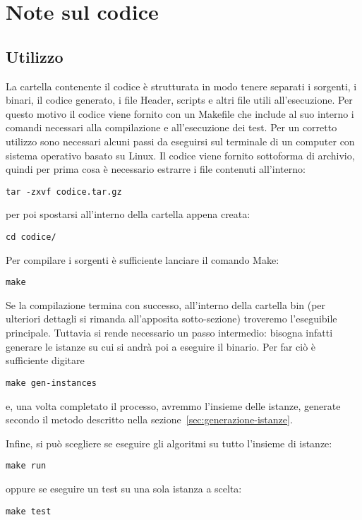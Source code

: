 
\section{Note sul codice}\label{sec:codice}
\subsection{Utilizzo}\label{subsec:utilizzo}
La cartella contenente il codice è strutturata in modo tenere separati i sorgenti, i binari, il codice generato,
i file Header, scripts e altri file utili all'esecuzione.
Per questo motivo il codice viene fornito con un \textsf{Makefile} che include al suo interno i comandi
necessari alla compilazione e all'esecuzione dei test.
Per un corretto utilizzo sono necessari alcuni passi da eseguirsi sul terminale di un computer con sistema
operativo basato su Linux.
%
Il codice viene fornito sottoforma di archivio, quindi per prima cosa è necessario estrarre
i file contenuti all'interno:
\label{lst:make-passo-1}
\begin{lstlisting}[style=BashStyle]
tar -zxvf codice.tar.gz
\end{lstlisting}
per poi spostarsi all'interno della cartella appena creata:
\label{lst:make-passo-2}
\begin{lstlisting}[style=BashStyle]
cd codice/
\end{lstlisting}
%
Per compilare i sorgenti è sufficiente lanciare il comando \textsf{Make}:
\label{lst:make-passo-3}
\begin{lstlisting}[style=BashStyle]
make
\end{lstlisting}
%
Se la compilazione termina con successo, all'interno della
cartella \textsf{bin} (per ulteriori dettagli si rimanda all'apposita sotto-sezione) troveremo
l'eseguibile principale.
Tuttavia si rende necessario un passo intermedio: bisogna infatti generare le istanze su cui si andrà
poi a eseguire il binario.
Per far ciò è sufficiente digitare
\label{lst:make-passo-4}
\begin{lstlisting}[style=BashStyle]
make gen-instances
\end{lstlisting}
e, una volta completato il processo, avremmo l'insieme delle istanze, generate secondo il metodo
descritto nella sezione~\ref{sec:generazione-istanze}.

Infine, si può scegliere se eseguire gli algoritmi su tutto l'insieme di istanze:
\label{lst:make-passo-5}
\begin{lstlisting}[style=BashStyle]
make run
\end{lstlisting}
oppure se eseguire un test su una sola istanza a scelta:
\label{lst:make-passo-6}
\begin{lstlisting}[style=BashStyle]
make test
\end{lstlisting}
